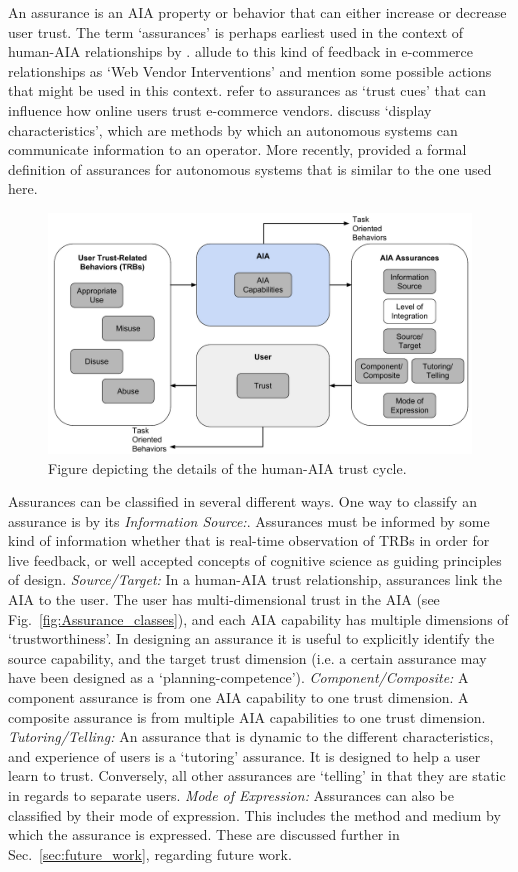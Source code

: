 An assurance is an AIA property or behavior that can either increase or decrease user trust. The term `assurances' is perhaps earliest used in the context of human-AIA relationships by \citet{Sheridan1984-kx}. \citet{McKnight2001-fa} allude to this kind of feedback in e-commerce relationships as `Web Vendor Interventions' and mention some possible actions that might be used in this context. \citet{Corritore2003-gx} refer to assurances as `trust cues' that can influence how online users trust e-commerce vendors. \citet{Lee2004-pv} discuss `display characteristics', which are methods by which an autonomous systems can communicate information to an operator. More recently, \citet{Lillard2016-yg} provided a formal definition of assurances for autonomous systems that is similar to the one used here. 

\begin{figure}[t]%
    \centering
    \includegraphics[width=0.6\linewidth]{Figures/RefinedTrust_one_way.pdf}
    \caption{Figure depicting the details of the human-AIA trust cycle.}
    \label{fig:refined_trust}
\end{figure}

Assurances can be classified in several different ways. One way to classify an assurance is by its \emph{Information Source:}. Assurances must be informed by some kind of information whether that is real-time observation of TRBs in order for live feedback, or well accepted concepts of cognitive science as guiding principles of design.
\emph{Source/Target:} In a human-AIA trust relationship, assurances link the AIA to the user. The user has multi-dimensional trust in the AIA (see Fig.~\ref{fig:Assurance_classes}), and each AIA capability has multiple dimensions of `trustworthiness'. In designing an assurance it is useful to explicitly identify the source capability, and the target trust dimension (i.e. a certain assurance may have been designed as a `planning-competence').
\emph{Component/Composite:} A component assurance is from one AIA capability to one trust dimension. A composite assurance is from multiple AIA capabilities to one trust dimension.
\emph{Tutoring/Telling:} An assurance that is dynamic to the different characteristics, and experience of users is a `tutoring' assurance. It is designed to help a user learn to trust. Conversely, all other assurances are `telling' in that they are static in regards to separate users.
\emph{Mode of Expression:} Assurances can also be classified by their mode of expression. This includes the method and medium by which the assurance is expressed.
These are discussed further in Sec.~\ref{sec:future_work}, regarding future work.

